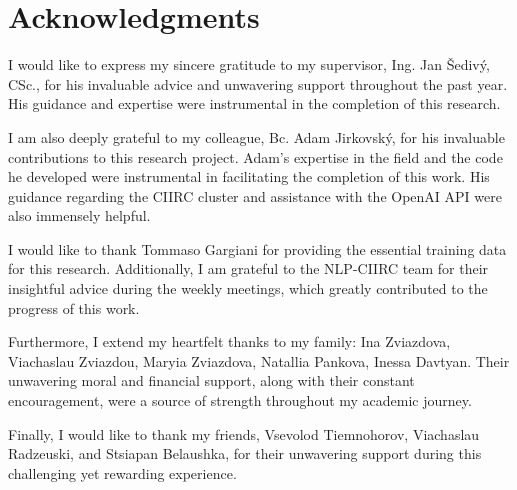 
\section*{Acknowledgments}

I would like to express my sincere gratitude to my supervisor, Ing. Jan Šedivý, CSc., for his invaluable advice and unwavering support throughout the past year.
His guidance and expertise were instrumental in the completion of this research.

I am also deeply grateful to my colleague, Bc. Adam Jirkovský, for his invaluable contributions to this research project.
Adam's expertise in the field and the code he developed were instrumental in facilitating the completion of this work.
His guidance regarding the CIIRC cluster and assistance with the OpenAI API were also immensely helpful.

I would like to thank Tommaso Gargiani for providing the essential training data for this research.
Additionally, I am grateful to the NLP-CIIRC team for their insightful advice during the weekly meetings, which greatly contributed to the progress of this work.

Furthermore, I extend my heartfelt thanks to my family: Ina Zviazdova, Viachaslau Zviazdou, Maryia Zviazdova, Natallia Pankova, Inessa Davtyan.
Their unwavering moral and financial support, along with their constant encouragement, were a source of strength throughout my academic journey.

Finally, I would like to thank my friends, Vsevolod Tiemnohorov, Viachaslau Radzeuski, and Stsiapan Belaushka, for their unwavering support during this challenging yet rewarding experience.

\vspace{2.5cm}
